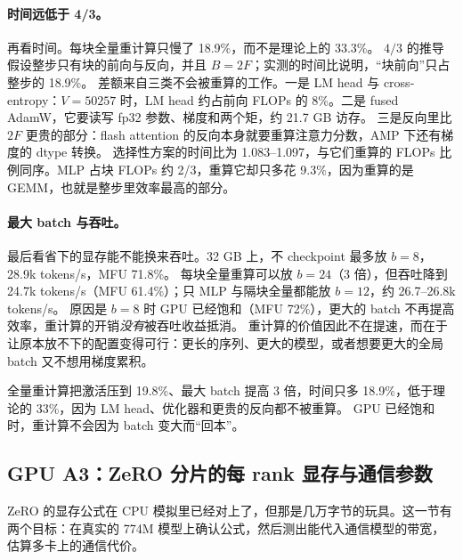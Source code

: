 \documentclass[11pt,a4paper]{ctexart}
\begin{document}
\paragraph{时间远低于 4/3。} 再看时间。每块全量重计算只慢了 18.9\%，而不是理论上的 33.3\%。
$4/3$ 的推导假设整步只有块的前向与反向，并且 $B=2F$；实测的时间比说明，“块前向”只占整步的 18.9\%。
差额来自三类不会被重算的工作。一是 LM head 与 cross-entropy：$V=50257$ 时，LM head 约占前向 FLOPs 的 8\%。二是 fused AdamW，它要读写 fp32 参数、梯度和两个矩，约 21.7 GB 访存。
三是反向里比 $2F$ 更贵的部分：flash attention 的反向本身就要重算注意力分数，AMP 下还有梯度的 dtype 转换。
选择性方案的时间比为 1.083--1.097，与它们重算的 FLOPs 比例同序。MLP 占块 FLOPs 约 2/3，重算它却只多花 9.3\%，因为重算的是 GEMM，也就是整步里效率最高的部分。

\paragraph{最大 batch 与吞吐。} 最后看省下的显存能不能换来吞吐。32 GB 上，不 checkpoint 最多放 $b=8$，28.9k tokens/s，MFU 71.8\%。
每块全量重算可以放 $b=24$（3 倍），但吞吐降到 24.7k tokens/s（MFU 61.4\%）；只 MLP 与隔块全量都能放 $b=12$，约 26.7--26.8k tokens/s。
原因是 $b=8$ 时 GPU 已经饱和（MFU 72\%），更大的 batch 不再提高效率，重计算的开销\emph{没有}被吞吐收益抵消。
重计算的价值因此不在提速，而在于让原本放不下的配置变得可行：更长的序列、更大的模型，或者想要更大的全局 batch 又不想用梯度累积。

\begin{findingbox}[：重计算]
全量重计算把激活压到 19.8\%、最大 batch 提高 3 倍，时间只多 18.9\%，低于理论的 33\%，因为 LM head、优化器和更贵的反向都不被重算。
GPU 已经饱和时，重计算不会因为 batch 变大而“回本”。
\end{findingbox}

\subsection{GPU A3：ZeRO 分片的每 rank 显存与通信参数}\label{sec:zero}
ZeRO 的显存公式在 CPU 模拟里已经对上了，但那是几万字节的玩具。这一节有两个目标：在真实的 774M 模型上确认公式，然后测出能代入通信模型的带宽，估算多卡上的通信代价。
\end{document}
